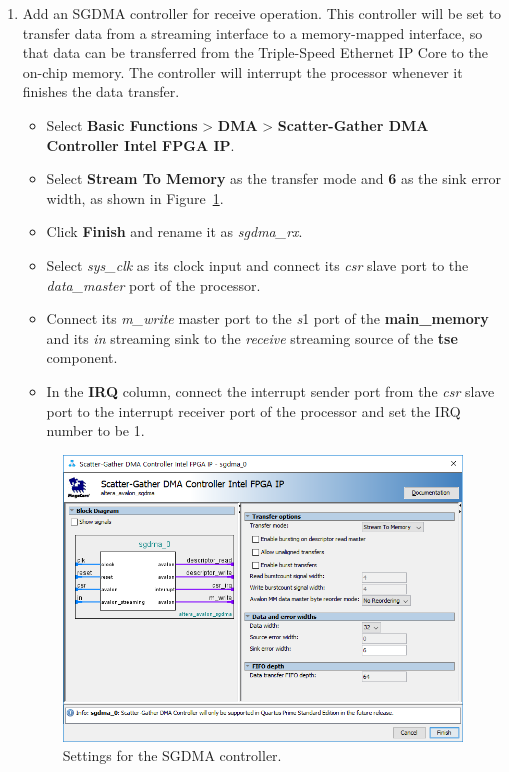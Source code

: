 \documentclass[11pt, twoside, pdftex]{article}
\begin{document}
\begin{enumerate}
	\item Add an SGDMA controller for receive operation. This controller will be set to transfer data from a streaming interface to a memory-mapped interface, so that data can be transferred from the Triple-Speed Ethernet IP Core to the on-chip memory. The controller will interrupt the processor whenever it finishes the data transfer. 
		\begin{itemize}
			\item Select {\bf Basic Functions} > {\bf DMA} > {\bf Scatter-Gather DMA Controller Intel FPGA IP}. 
			\item Select {\bf Stream To Memory} as the transfer mode and {\bf 6} as the sink error width, as shown in Figure~\ref{fig:sgdma_settings1}.  
			\item Click {\bf Finish} and rename it as {\it sgdma\_rx}.
			\item Select {\it sys\_clk} as its clock input and connect its {\it csr} slave port to the {\it data\_master} port of the processor.
			\item Connect its {\it m\_write} master port to the {\it s}1 port of the {\bf main\_memory} and its {\it in} streaming sink to the {\it receive} streaming source of the {\bf tse} component.		
			\item In the {\bf IRQ} column, connect the interrupt sender port from the {\it csr} slave port to the interrupt receiver port of the processor and set the IRQ number to be 1.
		\end{itemize}
		
		\begin{figure}[H]
			\centering
			  \includegraphics[scale=0.65]{figures/sgdma_settings1.png}
			\caption{Settings for the SGDMA controller.} 
			\label{fig:sgdma_settings1}
		\end{figure}		
	

\end{enumerate}
\end{document}
